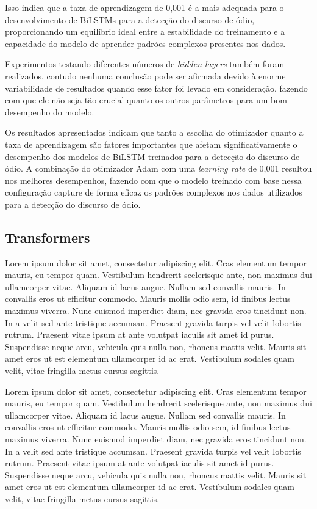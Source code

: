 \documentclass[conference]{IEEEtran}
\begin{document}
Isso indica que a taxa de aprendizagem de 0,001 é a mais adequada para o desenvolvimento de BiLSTMs para a detecção do discurso de ódio, proporcionando um equilíbrio ideal entre a estabilidade do treinamento e a capacidade do modelo de aprender padrões complexos presentes nos dados.

Experimentos testando diferentes números de \textit{hidden layers} também foram realizados, contudo nenhuma conclusão pode ser afirmada devido à enorme variabilidade de resultados quando esse fator foi levado em consideração, fazendo com que ele não seja tão crucial quanto os outros parâmetros para um bom desempenho do modelo.

Os resultados apresentados indicam que tanto a escolha do otimizador quanto a taxa de aprendizagem são fatores importantes que afetam significativamente o desempenho dos modelos de BiLSTM treinados para a detecção do discurso de ódio. A combinação do otimizador Adam com uma \textit{learning rate} de 0,001 resultou nos melhores desempenhos, fazendo com que o modelo treinado com base nessa configuração capture de forma eficaz os padrões complexos nos dados utilizados para a detecção do discurso de ódio.

\subsection{Transformers}

Lorem ipsum dolor sit amet, consectetur adipiscing elit. Cras elementum tempor mauris, eu tempor quam. Vestibulum hendrerit scelerisque ante, non maximus dui ullamcorper vitae. Aliquam id lacus augue. Nullam sed convallis mauris. In convallis eros ut efficitur commodo. Mauris mollis odio sem, id finibus lectus maximus viverra. Nunc euismod imperdiet diam, nec gravida eros tincidunt non. In a velit sed ante tristique accumsan. Praesent gravida turpis vel velit lobortis rutrum. Praesent vitae ipsum at ante volutpat iaculis sit amet id purus. Suspendisse neque arcu, vehicula quis nulla non, rhoncus mattis velit. Mauris sit amet eros ut est elementum ullamcorper id ac erat. Vestibulum sodales quam velit, vitae fringilla metus cursus sagittis.

Lorem ipsum dolor sit amet, consectetur adipiscing elit. Cras elementum tempor mauris, eu tempor quam. Vestibulum hendrerit scelerisque ante, non maximus dui ullamcorper vitae. Aliquam id lacus augue. Nullam sed convallis mauris. In convallis eros ut efficitur commodo. Mauris mollis odio sem, id finibus lectus maximus viverra. Nunc euismod imperdiet diam, nec gravida eros tincidunt non. In a velit sed ante tristique accumsan. Praesent gravida turpis vel velit lobortis rutrum. Praesent vitae ipsum at ante volutpat iaculis sit amet id purus. Suspendisse neque arcu, vehicula quis nulla non, rhoncus mattis velit. Mauris sit amet eros ut est elementum ullamcorper id ac erat. Vestibulum sodales quam velit, vitae fringilla metus cursus sagittis.
\end{document}
